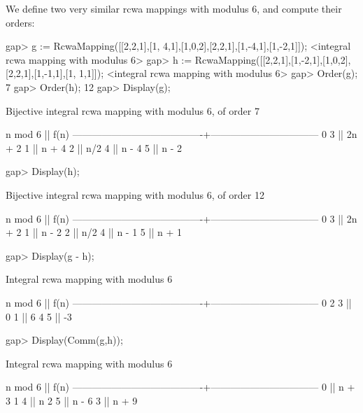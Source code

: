 We define two very similar rcwa mappings with modulus 6, and compute
their orders:

\beginexample
gap> g := RcwaMapping([[2,2,1],[1, 4,1],[1,0,2],[2,2,1],[1,-4,1],[1,-2,1]]);
<integral rcwa mapping with modulus 6>
gap> h := RcwaMapping([[2,2,1],[1,-2,1],[1,0,2],[2,2,1],[1,-1,1],[1, 1,1]]);
<integral rcwa mapping with modulus 6>
gap> Order(g);
7
gap> Order(h);
12
gap> Display(g);

Bijective integral rcwa mapping with modulus 6, of order 7

               n mod 6                  ||              f(n)              
----------------------------------------+---------------------------------
  0 3                                   || 2n + 2
  1                                     || n + 4
  2                                     || n/2
  4                                     || n - 4
  5                                     || n - 2

\endexample
\beginexample
gap> Display(h);

Bijective integral rcwa mapping with modulus 6, of order 12

               n mod 6                  ||              f(n)              
----------------------------------------+---------------------------------
  0 3                                   || 2n + 2
  1                                     || n - 2
  2                                     || n/2
  4                                     || n - 1
  5                                     || n + 1

\endexample
\beginexample
gap> Display(g - h);

Integral rcwa mapping with modulus 6

               n mod 6                  ||              f(n)              
----------------------------------------+---------------------------------
  0 2 3                                 || 0
  1                                     || 6
  4 5                                   || -3

gap> Display(Comm(g,h));

Integral rcwa mapping with modulus 6

               n mod 6                  ||              f(n)              
----------------------------------------+---------------------------------
  0                                     || n + 3
  1 4                                   || n
  2 5                                   || n - 6
  3                                     || n + 9

